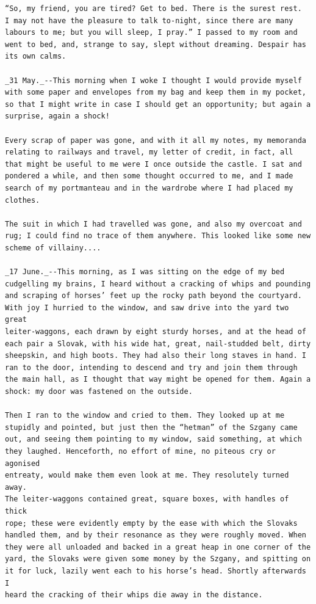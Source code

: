 \documentclass{article}
\begin{document}
\begin{verbatim}
“So, my friend, you are tired? Get to bed. There is the surest rest.
I may not have the pleasure to talk to-night, since there are many
labours to me; but you will sleep, I pray.” I passed to my room and
went to bed, and, strange to say, slept without dreaming. Despair has
its own calms.

_31 May._--This morning when I woke I thought I would provide myself
with some paper and envelopes from my bag and keep them in my pocket,
so that I might write in case I should get an opportunity; but again a
surprise, again a shock!

Every scrap of paper was gone, and with it all my notes, my memoranda
relating to railways and travel, my letter of credit, in fact, all
that might be useful to me were I once outside the castle. I sat and
pondered a while, and then some thought occurred to me, and I made
search of my portmanteau and in the wardrobe where I had placed my
clothes.

The suit in which I had travelled was gone, and also my overcoat and
rug; I could find no trace of them anywhere. This looked like some new
scheme of villainy....

_17 June._--This morning, as I was sitting on the edge of my bed
cudgelling my brains, I heard without a cracking of whips and pounding
and scraping of horses’ feet up the rocky path beyond the courtyard.
With joy I hurried to the window, and saw drive into the yard two great
leiter-waggons, each drawn by eight sturdy horses, and at the head of
each pair a Slovak, with his wide hat, great, nail-studded belt, dirty
sheepskin, and high boots. They had also their long staves in hand. I
ran to the door, intending to descend and try and join them through
the main hall, as I thought that way might be opened for them. Again a
shock: my door was fastened on the outside.

Then I ran to the window and cried to them. They looked up at me
stupidly and pointed, but just then the “hetman” of the Szgany came
out, and seeing them pointing to my window, said something, at which
they laughed. Henceforth, no effort of mine, no piteous cry or agonised
entreaty, would make them even look at me. They resolutely turned away.
The leiter-waggons contained great, square boxes, with handles of thick
rope; these were evidently empty by the ease with which the Slovaks
handled them, and by their resonance as they were roughly moved. When
they were all unloaded and backed in a great heap in one corner of the
yard, the Slovaks were given some money by the Szgany, and spitting on
it for luck, lazily went each to his horse’s head. Shortly afterwards I
heard the cracking of their whips die away in the distance.


\end{verbatim}
\end{document}
